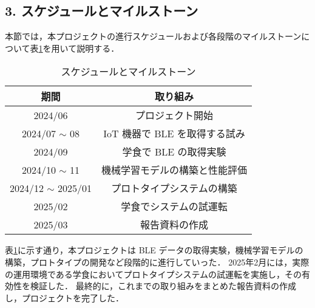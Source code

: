\subsection*{3. スケジュールとマイルストーン}

本節では，本プロジェクトの進行スケジュールおよび各段階のマイルストーンについて表\ref{tbl:スケジュールとマイルストーン}を用いて説明する．

\begin{table}[tp]
	\centering
	\caption{スケジュールとマイルストーン}
	\label{tbl:スケジュールとマイルストーン}
	\begin{tabular}{cc} \hline
		期間 & 取り組み　\\ \hline
		2024/06 & プロジェクト開始\\
		2024/07 $\sim$ 08 & IoT 機器で BLE を取得する試み\\
		2024/09 & 学食で BLE の取得実験\\
		2024/10 $\sim$ 11 & 機械学習モデルの構築と性能評価\\
		2024/12 $\sim$ 2025/01 & プロトタイプシステムの構築\\ 
		2025/02 & 学食でシステムの試運転\\
		2025/03 & 報告資料の作成\\ \hline
	\end{tabular}
\end{table}

表\ref{tbl:スケジュールとマイルストーン}に示す通り，本プロジェクトは BLE データの取得実験，機械学習モデルの構築，プロトタイプの開発など段階的に進行していった．
2025年2月には，実際の運用環境である学食においてプロトタイプシステムの試運転を実施し，その有効性を検証した．
最終的に，これまでの取り組みをまとめた報告資料の作成し，プロジェクトを完了した．




